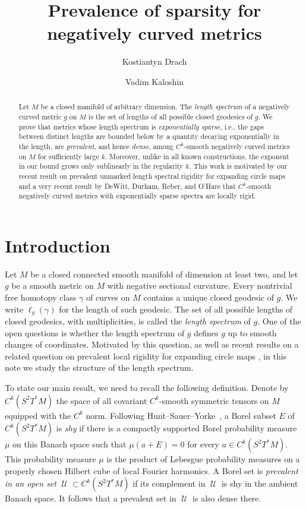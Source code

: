 \documentclass[10pt,oneside,reqno]{amsproc}
\date{}
\title[Prevalence of sparsity for negatively curved metrics]{Prevalence of sparsity for negatively curved metrics}
\author[Kostiantyn Drach]{Kostiantyn Drach}
\author[Vadim Kaloshin]{Vadim Kaloshin}
\numberwithin{equation}{section}
\theoremstyle{definition}
\theoremstyle{remark}
\DeclareMathOperator{\cU}{{\mathscr U}}
\begin{document}
\begin{abstract}
Let $M$ be a closed manifold of arbitrary dimension. The \emph{length spectrum} of a negatively curved metric $g$ on $M$ is the set of lengths of all possible closed geodesics of $g$. We prove that metrics whose length spectrum is \emph{exponentially sparse}, i.e., the gaps between distinct lengths are bounded below by a quantity decaying exponentially in the length, are \emph{prevalent}, and hence \emph{dense}, among $C^k$-smooth negatively curved metrics on $M$ for sufficiently large $k$. Moreover, unlike in all known constructions, the exponent in our bound grows only sublinearly in the regularity $k$. This work is motivated by our recent result on prevalent unmarked length spectral rigidity for expanding circle maps and a very recent result by DeWitt, Durham, Reber, and O'Hare that $C^k$-smooth negatively curved metrics with exponentially sparse spectra are locally rigid.
\end{abstract}

\maketitle


\section{Introduction}
Let $M$ be a closed connected smooth manifold of dimension at least two, and let $g$ be a smooth metric on $M$ with negative sectional curvature. Every nontrivial free homotopy class $\gamma$ of curves on $M$ contains a unique closed geodesic of $g$. We write $\ell_g(\gamma)$ for the length of such geodesic. The set of all possible lengths of closed geodesics, with multiplicities, is called the \emph{length spectrum} of $g$. One of the open questions is whether the length spectrum of $g$ defines $g$ up to smooth changes of coordinates. Motivated by this question, as well as recent results on a related question on prevalent local rigidity for expanding circle maps \cite{DK}, in this note we study the structure of the length spectrum.

To state our main result, we need to recall the following definition. Denote by $C^k(S^2T^*M)$ the space of all covariant $C^k$-smooth symmetric tensors on $M$ equipped with the $C^k$ norm. Following Hunt--Sauer--Yorke~\cite{HSY}, a Borel subset $E$ of $C^k(S^2T^*M)$ is \emph{shy} if there is a compactly supported Borel probability measure $\mu$ on this Banach space such that $\mu(a+E)=0$ for every $a\in C^k(S^2T^*M)$. This probability measure $\mu$ is the product of Lebesgue probability measures on a properly chosen Hilbert cube of local Fourier harmonics. A Borel set is \emph{prevalent in an open set} $\cU \subset C^k(S^2T^*M)$ if its complement in $\cU$ is shy in the ambient Banach space. It follows that a prevalent set in $\cU$ is also dense there.
\end{document}
